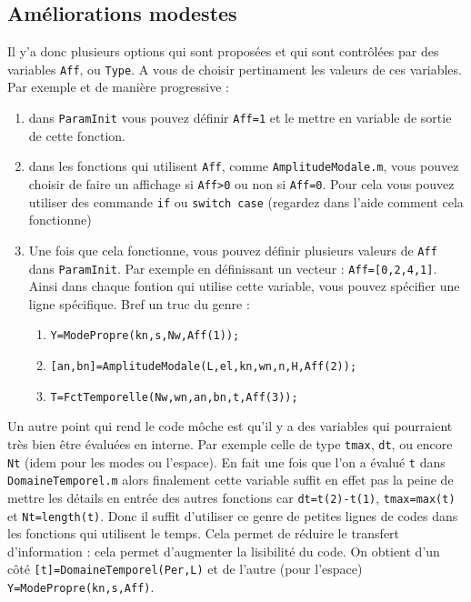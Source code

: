 \documentclass[a4paper,10pt]{article}
\begin{document}
\subsection{Améliorations modestes}
Il y'a donc plusieurs options qui sont proposées et qui sont contrôlées par des variables \verb"Aff", ou \verb"Type". A vous de choisir pertinament les valeurs de ces variables. 
Par exemple et de manière progressive :
\begin{enumerate}
    \item dans \verb"ParamInit" vous pouvez définir \verb"Aff=1" et le mettre en variable de sortie de cette fonction. 
    \item dans les fonctions qui utilisent \verb"Aff", comme \verb"AmplitudeModale.m", vous pouvez choisir de faire un affichage si \verb"Aff>0" ou non si \verb"Aff=0". Pour cela vous pouvez utiliser des commande \verb"if" ou \verb"switch case" (regardez dans l'aide comment cela fonctionne)
    \item Une fois que cela fonctionne, vous pouvez définir plusieurs valeurs de \verb"Aff" dans \verb"ParamInit". Par exemple en définissant un vecteur : \verb"Aff=[0,2,4,1]". Ainsi dans chaque fontion qui utilise cette variable, vous pouvez spécifier une ligne spécifique. Bref un truc du genre : 
\begin{enumerate}
    \item[]\verb"Y=ModePropre(kn,s,Nw,Aff(1));"    
    \item[]\verb"[an,bn]=AmplitudeModale(L,el,kn,wn,n,H,Aff(2));"
    \item[] \verb"T=FctTemporelle(Nw,wn,an,bn,t,Aff(3));"
\end{enumerate}
\end{enumerate}
Un autre point qui rend le code môche est qu'il y a des variables qui pourraient très bien être évaluées en interne. Par exemple celle de type \verb"tmax", \verb"dt", ou encore \verb"Nt" (idem pour les modes ou l'espace). En fait une fois que l'on a évalué \verb"t" dans \verb"DomaineTemporel.m" alors finalement cette variable suffit en effet pas la peine de mettre les détails en entrée des autres fonctions car 
\verb"dt=t(2)-t(1)", \verb"tmax=max(t)" et \verb"Nt=length(t)". Donc il suffit d'utiliser ce genre de petites lignes de codes dans les fonctions qui utilisent le temps. Cela permet de réduire le transfert d'information : cela permet d'augmenter la lisibilité du code. On obtient d'un côté  \verb"[t]=DomaineTemporel(Per,L)" et de l'autre (pour l'espace) \verb"Y=ModePropre(kn,s,Aff)".\\
\end{document}
